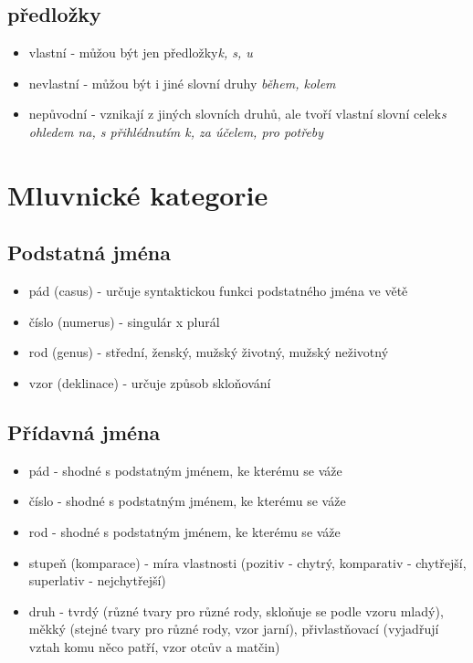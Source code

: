 \documentclass{memoir}
\begin{document}
	\subsection*{předložky}
	\begin{itemize}
		\item vlastní - můžou být jen předložky\hfill\textit{k, s, u}
		\item nevlastní - můžou být i jiné slovní druhy \hfill\textit{během, kolem}
		\item nepůvodní - vznikají z jiných slovních druhů, ale tvoří vlastní slovní celek\hfill\textit{s ohledem na, s přihlédnutím k, za účelem, pro potřeby}
	\end{itemize}

\section*{Mluvnické kategorie}
	\subsection*{Podstatná jména}
		\begin{itemize}
			\item pád (casus) - určuje syntaktickou funkci podstatného jména ve větě
			\item číslo (numerus) - singulár x plurál
			\item rod (genus) - střední, ženský, mužský životný, mužský neživotný
			\item vzor (deklinace) - určuje způsob skloňování
		\end{itemize}
	\subsection*{Přídavná jména}
		\begin{itemize}
			\item pád - shodné s podstatným jménem, ke kterému se váže
			\item číslo - shodné s podstatným jménem, ke kterému se váže
			\item rod - shodné s podstatným jménem, ke kterému se váže
			\item stupeň (komparace) - míra vlastnosti (pozitiv - chytrý, komparativ - chytřejší, superlativ - nejchytřejší)
			\item druh - tvrdý (různé tvary pro různé rody, skloňuje se podle vzoru mladý), měkký (stejné tvary pro různé rody, vzor jarní), přivlastňovací (vyjadřují vztah komu něco patří, vzor otcův a matčin)
		\end{itemize}
\end{document}
